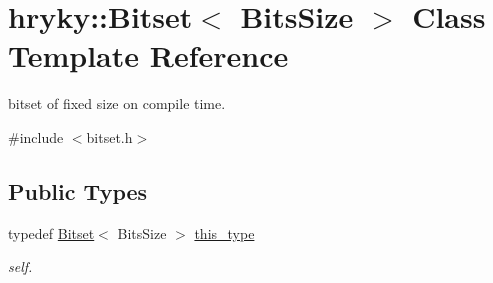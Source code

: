 \hypertarget{classhryky_1_1_bitset}{\section{hryky\-:\-:Bitset$<$ Bits\-Size $>$ Class Template Reference}
\label{classhryky_1_1_bitset}
}


bitset of fixed size on compile time.  




{\ttfamily \#include $<$bitset.\-h$>$}

\subsection*{Public Types}
\begin{DoxyCompactItemize}
\item 
\hypertarget{classhryky_1_1_bitset_a967bec88789e12e2ca96e7a73907822c}{typedef \hyperlink{classhryky_1_1_bitset}{Bitset}$<$ Bits\-Size $>$ \hyperlink{classhryky_1_1_bitset_a967bec88789e12e2ca96e7a73907822c}{this\-\_\-type}}\label{classhryky_1_1_bitset_a967bec88789e12e2ca96e7a73907822c}

\begin{DoxyCompactList}\small\item\em self. \end{DoxyCompactList}\end{DoxyCompactItemize}
